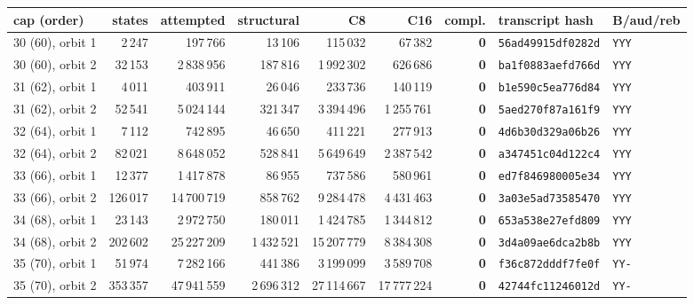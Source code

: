 \begin{tabular}{@{}lrrrrrrll@{}}
\toprule
cap (order) & states & attempted & structural & C8 & C16 & compl. & transcript hash & B/aud/reb \\ \midrule
30 (60), orbit 1 & 2\,247 & 197\,766 & 13\,106 & 115\,032 & 67\,382 & \textbf{0} & \texttt{56ad49915df0282d} & \texttt{YYY} \\
30 (60), orbit 2 & 32\,153 & 2\,838\,956 & 187\,816 & 1\,992\,302 & 626\,686 & \textbf{0} & \texttt{ba1f0883aefd766d} & \texttt{YYY} \\
31 (62), orbit 1 & 4\,011 & 403\,911 & 26\,046 & 233\,736 & 140\,119 & \textbf{0} & \texttt{b1e590c5ea776d84} & \texttt{YYY} \\
31 (62), orbit 2 & 52\,541 & 5\,024\,144 & 321\,347 & 3\,394\,496 & 1\,255\,761 & \textbf{0} & \texttt{5aed270f87a161f9} & \texttt{YYY} \\
32 (64), orbit 1 & 7\,112 & 742\,895 & 46\,650 & 411\,221 & 277\,913 & \textbf{0} & \texttt{4d6b30d329a06b26} & \texttt{YYY} \\
32 (64), orbit 2 & 82\,021 & 8\,648\,052 & 528\,841 & 5\,649\,649 & 2\,387\,542 & \textbf{0} & \texttt{a347451c04d122c4} & \texttt{YYY} \\
33 (66), orbit 1 & 12\,377 & 1\,417\,878 & 86\,955 & 737\,586 & 580\,961 & \textbf{0} & \texttt{ed7f846980005e34} & \texttt{YYY} \\
33 (66), orbit 2 & 126\,017 & 14\,700\,719 & 858\,762 & 9\,284\,478 & 4\,431\,463 & \textbf{0} & \texttt{3a03e5ad73585470} & \texttt{YYY} \\
34 (68), orbit 1 & 23\,143 & 2\,972\,750 & 180\,011 & 1\,424\,785 & 1\,344\,812 & \textbf{0} & \texttt{653a538e27efd809} & \texttt{YYY} \\
34 (68), orbit 2 & 202\,602 & 25\,227\,209 & 1\,432\,521 & 15\,207\,779 & 8\,384\,308 & \textbf{0} & \texttt{3d4a09ae6dca2b8b} & \texttt{YYY} \\
35 (70), orbit 1 & 51\,974 & 7\,282\,166 & 441\,386 & 3\,199\,099 & 3\,589\,708 & \textbf{0} & \texttt{f36c872dddf7fe0f} & \texttt{YY-} \\
35 (70), orbit 2 & 353\,357 & 47\,941\,559 & 2\,696\,312 & 27\,114\,667 & 17\,777\,224 & \textbf{0} & \texttt{42744fc11246012d} & \texttt{YY-} \\
\bottomrule
\end{tabular}
